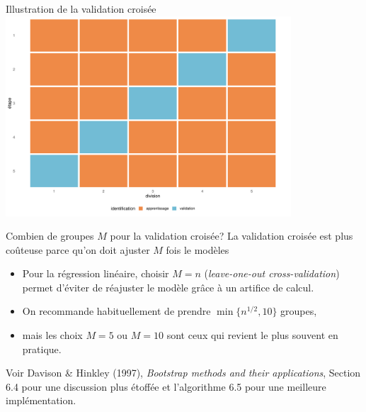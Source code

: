 \documentclass[
  ignorenonframetext,
]{beamer}
\providecommand{\tightlist}{%
  \setlength{\itemsep}{0pt}\setlength{\parskip}{0pt}}\usepackage{longtable,booktabs,array}
\begin{document}
\begin{frame}{Illustration de la validation croisée}
\label{illustration-de-la-validation-croisuxe9e}
\includegraphics[width=0.8\textwidth,height=\textheight]{MATH60602-diapos3_files/figure-beamer/validationcroiseeillust-1.pdf}
\end{frame}

\begin{frame}{Combien de groupes \(M\) pour la validation croisée?}
\label{combien-de-groupes-m-pour-la-validation-croisuxe9e}
La validation croisée est plus coûteuse parce qu'on doit ajuster \(M\)
fois le modèles

\begin{itemize}
\tightlist
\item
  Pour la régression linéaire, choisir \(M=n\) (\emph{leave-one-out
  cross-validation}) permet d'éviter de réajuster le modèle grâce à un
  artifice de calcul.
\item
  On recommande habituellement de prendre \(\min\{n^{1/2}, 10\}\)
  groupes,
\item
  mais les choix \(M=5\) ou \(M=10\) sont ceux qui revient le plus
  souvent en pratique.
\end{itemize}

\footnotesize

Voir Davison \& Hinkley (1997), \emph{Bootstrap methods and their
applications}, Section 6.4 pour une discussion plus étoffée et
l'algorithme 6.5 pour une meilleure implémentation.

\normalsize
\end{frame}
\end{document}
